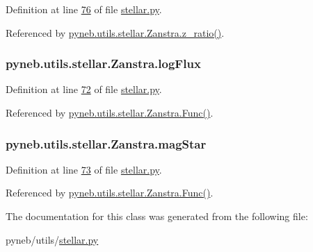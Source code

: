 Definition at line \hyperlink{stellar_8py_source_l00076}{76} of file \hyperlink{stellar_8py_source}{stellar.\-py}.



Referenced by \hyperlink{stellar_8py_source_l00081}{pyneb.\-utils.\-stellar.\-Zanstra.\-z\-\_\-ratio()}.

\hypertarget{classpyneb_1_1utils_1_1stellar_1_1_zanstra_a8c4fddabe252ad4c539244ace4e79227}{
\subsubsection[{log\-Flux}]{\setlength{\rightskip}{0pt plus 5cm}pyneb.\-utils.\-stellar.\-Zanstra.\-log\-Flux}}\label{classpyneb_1_1utils_1_1stellar_1_1_zanstra_a8c4fddabe252ad4c539244ace4e79227}


Definition at line \hyperlink{stellar_8py_source_l00072}{72} of file \hyperlink{stellar_8py_source}{stellar.\-py}.



Referenced by \hyperlink{stellar_8py_source_l00089}{pyneb.\-utils.\-stellar.\-Zanstra.\-Func()}.

\hypertarget{classpyneb_1_1utils_1_1stellar_1_1_zanstra_af635b1b8ca29b1b956b91e93f63fdf76}{
\subsubsection[{mag\-Star}]{\setlength{\rightskip}{0pt plus 5cm}pyneb.\-utils.\-stellar.\-Zanstra.\-mag\-Star}}\label{classpyneb_1_1utils_1_1stellar_1_1_zanstra_af635b1b8ca29b1b956b91e93f63fdf76}


Definition at line \hyperlink{stellar_8py_source_l00073}{73} of file \hyperlink{stellar_8py_source}{stellar.\-py}.



Referenced by \hyperlink{stellar_8py_source_l00089}{pyneb.\-utils.\-stellar.\-Zanstra.\-Func()}.



The documentation for this class was generated from the following file\-:\begin{DoxyCompactItemize}
\item 
pyneb/utils/\hyperlink{stellar_8py}{stellar.\-py}\end{DoxyCompactItemize}
